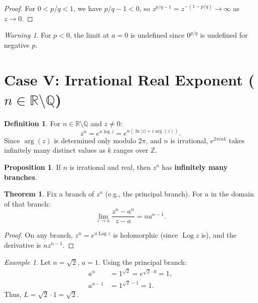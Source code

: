 \documentclass{article}
\theoremstyle{definition}
\newtheorem{definition}{Definition}[section]
\newtheorem{theorem}{Theorem}[section]
\newtheorem{proposition}{Proposition}[section]
\theoremstyle{remark}
\newtheorem{example}{Example}[section]
\newtheorem{warning}{Warning}[section]
\newcommand{\R}{\mathbb{R}}
\newcommand{\Z}{\mathbb{Z}}
\newcommand{\Q}{\mathbb{Q}}
\newcommand{\Log}{\operatorname{Log}}
\begin{document}
\begin{proof}
For $0 < p/q < 1$, we have $p/q - 1 < 0$, so $z^{p/q - 1} = z^{-(1 - p/q)} \to \infty$ as $z \to 0$.
\end{proof}

\begin{warning}
For $p < 0$, the limit at $a = 0$ is undefined since $0^{p/q}$ is undefined for negative $p$.
\end{warning}

\section{Case V: Irrational Real Exponent ($n \in \R \setminus \Q$)}

\begin{definition}
For $n \in \R \setminus \Q$ and $z \neq 0$:
\begin{equation}
z^n = e^{n \log z} = e^{n(\ln|z| + i\arg(z))}.
\end{equation}
Since $\arg(z)$ is determined only modulo $2\pi$, and $n$ is irrational, $e^{2\pi i n k}$ takes infinitely many distinct values as $k$ ranges over $\Z$.
\end{definition}

\begin{proposition}
If $n$ is irrational and real, then $z^n$ has \textbf{infinitely many branches}.
\end{proposition}

\begin{theorem}
Fix a branch of $z^n$ (e.g., the principal branch). For $a$ in the domain of that branch:
\begin{equation}
\lim_{z \to a} \frac{z^n - a^n}{z - a} = n a^{n-1}.
\end{equation}
\end{theorem}

\begin{proof}
On any branch, $z^n = e^{n \Log z}$ is holomorphic (since $\Log z$ is), and the derivative is $n z^{n-1}$.
\end{proof}

\begin{example}
Let $n = \sqrt{2}$, $a = 1$. Using the principal branch:
\begin{align}
a^n &= 1^{\sqrt{2}} = e^{\sqrt{2} \cdot 0} = 1, \\
a^{n-1} &= 1^{\sqrt{2}-1} = 1.
\end{align}
Thus, $L = \sqrt{2} \cdot 1 = \sqrt{2}$.
\end{example}
\end{document}
